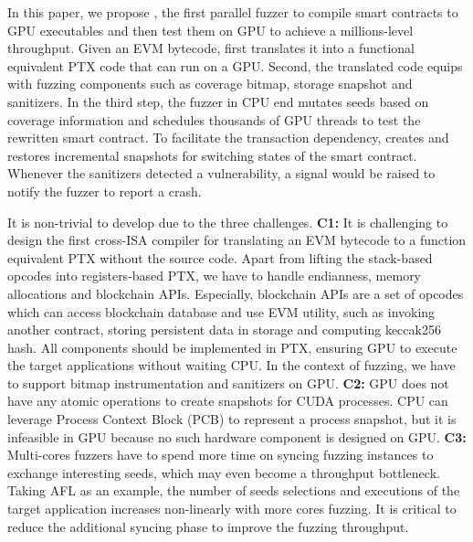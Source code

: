 In this paper, we propose {\tool}, the first parallel fuzzer to compile smart contracts to GPU executables and then test them on GPU to achieve a millions-level throughput.   
Given an EVM bytecode, {\tool} first translates it into a functional equivalent PTX code that can run on a GPU. 
Second, the translated code equips with fuzzing components such as coverage bitmap, storage snapshot and sanitizers. 
In the third step, the fuzzer in CPU end mutates seeds based on coverage information and schedules thousands of GPU threads to test the rewritten smart contract.
To facilitate the transaction dependency, {\tool} creates and restores incremental snapshots for switching states of the smart contract. 
Whenever the sanitizers detected a vulnerability, a signal would be raised to notify the fuzzer to report a crash.

It is non-trivial to develop {\tool} due to the three challenges. 
\textbf{C1:} 
It is challenging to design the first cross-ISA compiler for translating an EVM bytecode to a function equivalent PTX without the source code. 
Apart from lifting the stack-based opcodes into registers-based PTX, we have to handle endianness, memory allocations and blockchain APIs. 
Especially, blockchain APIs are a set of opcodes which can access blockchain database and use EVM utility, such as invoking another contract, storing persistent data in storage and computing keccak256 hash.
All components should be implemented in PTX, ensuring GPU to execute the target applications without waiting CPU. 
In the context of fuzzing, we have to support bitmap instrumentation and sanitizers on GPU.
%
\textbf{C2:} 
GPU does not have any atomic operations to create snapshots for CUDA processes. 
CPU can leverage Process Context Block (PCB) to represent a process snapshot, but it is infeasible in GPU because no such hardware component is designed on GPU.
%
\textbf{C3:} 
Multi-cores fuzzers have to spend more time on syncing fuzzing instances to exchange interesting seeds, which may even become a throughput bottleneck.
Taking AFL as an example, the number of seeds selections and executions of the target application increases non-linearly with more cores fuzzing\cite{xu2017designing}. 
It is critical to reduce the additional syncing phase to improve the fuzzing throughput.


